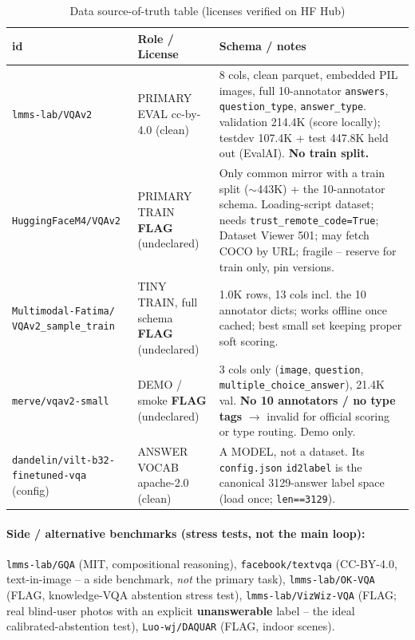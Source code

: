 \documentclass[12pt,a4paper]{article}
\begin{document}
\begin{table}[H]
\centering
\caption{Data source-of-truth table (licenses verified on HF Hub)}
\small
\setlength{\tabcolsep}{4pt}
\begin{tabularx}{\linewidth}{@{} p{3.6cm} p{2.5cm} L @{}}
\toprule
\textbf{id} & \textbf{Role / License} & \textbf{Schema / notes} \\
\midrule
\texttt{lmms-lab/VQAv2} & PRIMARY EVAL \newline cc-by-4.0 (clean) & 8 cols, clean parquet, embedded PIL images, full 10-annotator \texttt{answers}, \texttt{question\_type}, \texttt{answer\_type}. validation 214.4K (score locally); testdev 107.4K + test 447.8K held out (EvalAI). \textbf{No train split.} \\
\texttt{HuggingFaceM4/VQAv2} & PRIMARY TRAIN \newline \textbf{FLAG} (undeclared) & Only common mirror with a train split ($\sim$443K) + the 10-annotator schema. Loading-script dataset; needs \texttt{trust\_remote\_code=True}; Dataset Viewer 501; may fetch COCO by URL; fragile -- reserve for train only, pin versions. \\
\texttt{Multimodal-Fatima/} \texttt{VQAv2\_sample\_train} & TINY TRAIN, full schema \newline \textbf{FLAG} (undeclared) & 1.0K rows, 13 cols incl. the 10 annotator dicts; works offline once cached; best small set keeping proper soft scoring. \\
\texttt{merve/vqav2-small} & DEMO / smoke \newline \textbf{FLAG} (undeclared) & 3 cols only (\texttt{image}, \texttt{question}, \texttt{multiple\_choice\_answer}), 21.4K val. \textbf{No 10 annotators / no type tags} $\rightarrow$ invalid for official scoring or type routing. Demo only. \\
\texttt{dandelin/vilt-b32-} \texttt{finetuned-vqa} (config) & ANSWER VOCAB \newline apache-2.0 (clean) & A MODEL, not a dataset. Its \texttt{config.json} \texttt{id2label} is the canonical 3129-answer label space (load once; \texttt{len==3129}). \\
\bottomrule
\end{tabularx}
\end{table}

\paragraph{Side / alternative benchmarks (stress tests, not the main loop):} \texttt{lmms-lab/GQA} (MIT, compositional reasoning), \texttt{facebook/textvqa} (CC-BY-4.0, text-in-image -- a side benchmark, \emph{not} the primary task), \texttt{lmms-lab/OK-VQA} (FLAG, knowledge-VQA abstention stress test), \texttt{lmms-lab/VizWiz-VQA} (FLAG; real blind-user photos with an explicit \textbf{unanswerable} label -- the ideal calibrated-abstention test), \texttt{Luo-wj/DAQUAR} (FLAG, indoor scenes).
\end{document}
